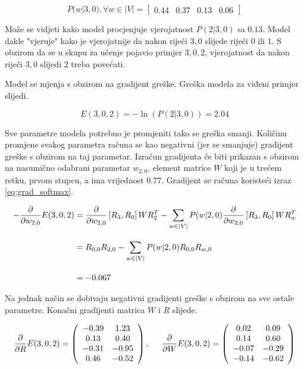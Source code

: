 \documentclass[times, utf8, diplomski, numeric]{fer}
\begin{document}
\[
P(w | 3, 0), \forall w \in |V| =
\left[ \begin{array}{cccc} 0.44 & 0.37 & 0.13 & 0.06 \end{array} \right]
\]

Može se vidjeti kako model procjenjuje vjerojatnost $P(2 | 3, 0)$ sa $0.13$. Model dakle "vjeruje" kako je vjerojatnije da nakon riječi $3, 0$ slijede riječi $0$ ili $1$. S obzirom da se u skupu za učenje pojavio primjer $3, 0, 2$, vjerojatnost da nakon riječi $3, 0$ slijedi $2$ treba povećati.

Model se mjenja s obzirom na gradijent greške. Greška modela za viđeni primjer slijedi.

\[
E(3, 0, 2) = - \ln \left( P(2 | 3, 0) \right) = 2.04
\]

Sve parametre modela potrebno je promjeniti tako se greška smanji. Količinu promjene svakog parametra računa se kao negativni (jer se smanjuje) gradijent greške s obzirom na taj parametar. Izračun gradijenta će biti prikazan s obzirom na nasumično odabrani parametar $w_{2, 0}$, element matrice $W$ koji je u trećem retku, prvom stupcu, a ima vrijednost $0.77$. Gradijent se računa koristeći izraz \ref{eq:grad_softmax}.

\begin{equation*}
\setlength{\jot}{12pt}
\begin{split}
- \frac{\partial}{\partial w_{2, 0}} E(3, 0, 2)
  & = \frac{\partial}{\partial w_{2, 0}} \left[R_3, R_0\right] W R_2^T
 - \sum_{w \in |V|} P(w | 2, 0) \frac{\partial}{\partial w_{2, 0}} \left[R_3, R_0\right] W R_w^T \\
  & = R_{0, 0} R_{2, 0} - \sum_{w \in |V|} P(w | 2, 0) R_{0, 0} R_{w, 0} \\
  & = -0.067
\end{split}
\end{equation*}

Na jednak način se dobivaju negativni gradijenti greške s obzirom na sve ostale parametre. Konačni gradijenti matrica $W$ i $R$ slijede.

\[ \frac{\partial}{\partial R}E(3, 0, 2) = \left( \begin{array}{cc}
-0.39 &  1.23 \\
 0.13 &  0.40 \\
-0.31 & -0.95 \\
 0.46 & -0.52 \\
 \end{array} \right),
%
\hspace{0.5cm} \frac{\partial}{\partial W}E(3, 0, 2) =
\left( \begin{array}{cc}
 0.02 &  0.09 \\
 0.14 &  0.60 \\
-0.07 & -0.29 \\
-0.14 & -0.62
\end{array} \right)
\]
\end{document}
